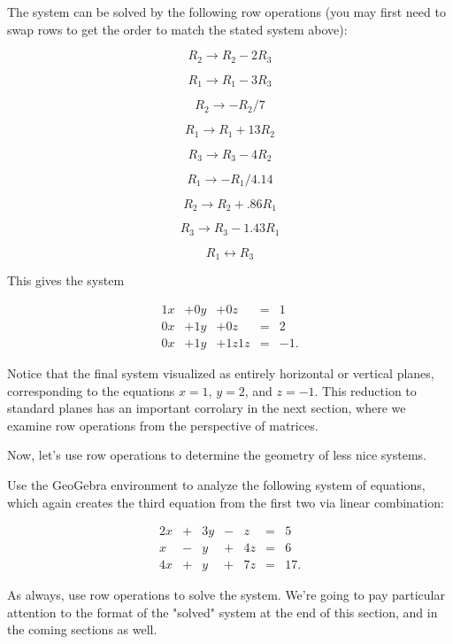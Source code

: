 \documentclass{ximera}
\begin{document}
        \begin{solution}

            The system can be solved by the following row operations (you may first need to swap rows to get the order to match the stated system above):


            $$R_2\rightarrow R_2-2R_3$$

            $$R_1\rightarrow R_1-3R_3$$

            $$R_2\rightarrow -R_2/7$$

            $$R_1\rightarrow R_1+13R_2$$

            $$R_3\rightarrow R_3-4R_2$$

            $$R_1\rightarrow -R_1/4.14$$

            $$R_2\rightarrow R_2+.86R_1$$

            $$R_3\rightarrow R_3-1.43R_1$$

            $$R_1\leftrightarrow R_3$$

            This gives the system 

            $$\begin{array}{ccccccc}
                 1x& +0y&+0z &=&1 \\
                0x&+1y& +0z& =&2\\
                0x &+1y &+1z 1z&=&-1.
            \end{array}$$

        \end{solution}


    \begin{remark}

        Notice that the final system visualized as entirely horizontal or vertical planes, corresponding to the equations $x=1$, $y=2$, and $z=-1$. This reduction to standard planes has an important corrolary in the next section, where we examine row operations from the perspective of matrices. 

    \end{remark}

    Now, let's use row operations to determine the geometry of less nice systems.

\begin{example}

    Use the GeoGebra environment to analyze the following system of equations, which again creates the third equation from the first two via linear combination:

    $$\begin{array}{ccccccc}
        2x & +&3y&-&z&= &5 \\
        x& -&y&+&4z&=&6\\
        4x& +&y&+&7z&=&17.
    \end{array}$$

    As always, use row operations to solve the system. We're going to pay particular attention to the format of the "solved" system at the end of this section, and in the coming sections as well.
    \end{example}
\end{document}
